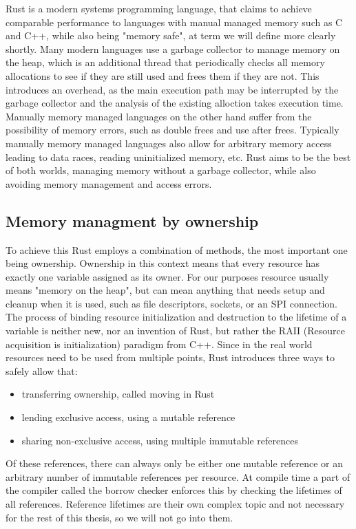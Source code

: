 Rust is a modern systems programming language,
that claims to achieve comparable performance to languages with manual managed memory such as C and C++,
while also being "memory safe", at term we will define more clearly shortly.
Many modern languages use a garbage collector to manage memory on the heap,
which is an additional thread that periodically checks all memory allocations to see if they are still used and frees them if they are not.
This introduces an overhead, as the main execution path may be interrupted by the garbage collector and the analysis of the existing alloction takes execution time.
Manually memory managed languages on the other hand suffer from the possibility of memory errors, such as double frees and use after frees.
Typically manually memory managed languages also allow for arbitrary memory access leading to data races, reading uninitialized memory, etc.
Rust aims to be the best of both worlds, managing memory without a garbage collector, while also avoiding memory management and access errors.

\subsection{Memory managment by ownership}
\label{sec:background:rust:ownership}

To achieve this Rust employs a combination of methods, the most important one being ownership.
Ownership in this context means that every resource has exactly one variable assigned as its owner.
For our purposes resource usually means "memory on the heap",
but can mean anything that needs setup and cleanup when it is used,
such as file descriptors, sockets, or an SPI connection.
The process of binding resource initialization and destruction to the lifetime of a variable is neither new,
nor an invention of Rust,
but rather the RAII (Resource acquisition is initialization) paradigm from C++.
Since in the real world resources need to be used from multiple points, Rust introduces three ways to safely allow that:
\begin{itemize}
    \item transferring ownership, called moving in Rust
    \item lending exclusive access, using a mutable reference
    \item sharing non-exclusive access, using multiple immutable references
\end{itemize}

Of these references, there can always only be either one mutable reference or an arbitrary number of immutable references per resource.
At compile time a part of the compiler called the borrow checker enforces this by checking the lifetimes of all references.
Reference lifetimes are their own complex topic and not necessary for the rest of this thesis, so we will not go into them.

